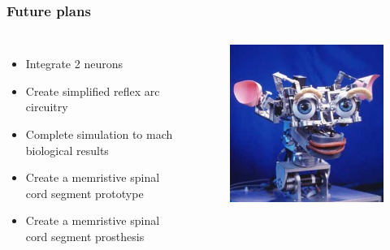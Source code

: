 \documentclass[12pt, aspectratio=169]{beamer}
\begin{document}
\begin{frame}
  \frametitle{Future plans}
\begin{columns}[c]

\begin{itemize}
\item Integrate 2 neurons
\item Create simplified reflex arc circuitry
\item Complete simulation to mach biological results
\item Create a memristive spinal cord segment prototype
\item Create a memristive spinal cord segment prosthesis
\end{itemize}

\begin{figure}
\includegraphics[width=1.0\linewidth]{Kismet_312}
\end{figure}
\end{columns}
\end{frame}
\end{document}
